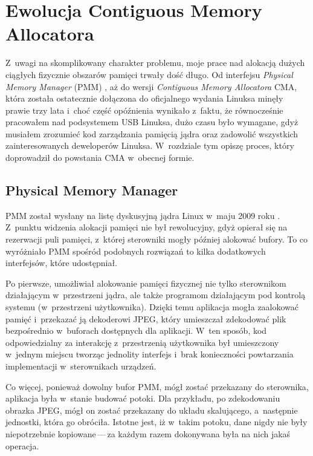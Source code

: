 \chapter{Ewolucja Contiguous Memory Allocatora}

Z~uwagi na skomplikowany charakter problemu, moje prace nad alokacją
dużych ciągłych fizycznie obszarów pamięci trwały dość długo.  Od
interfejsu \textit{Physical Memory Manager} (PMM)
\autocite{patch:pmm}, aż do wersji \textit{Contiguous Memory
  Allocatora} CMA, która została ostatecznie dołączona do oficjalnego
wydania Linuksa \autocite{patch:cma-24} minęły prawie trzy lata i~choć
część opóźnienia wynikało z~faktu, że równocześnie pracowałem nad
podsystemem USB Linuksa, dużo czasu było wymagane, gdyż musiałem
zrozumieć kod zarządzania pamięcią jądra oraz zadowolić wszystkich
zainteresowanych deweloperów Linuksa.  W~rozdziale tym opiszę proces,
który doprowadził do powstania CMA w~obecnej formie.


\section{Physical Memory Manager}\label{sec:evo-pmm}

PMM został wysłany na listę dyskusyjną jądra Linux w~maju 2009 roku
\autocite{patch:pmm}.  Z~punktu widzenia alokacji pamięci nie był
rewolucyjny, gdyż opierał się na rezerwacji puli pamięci, z~której
sterowniki mogły później alokować bufory.  To co wyróżniało PMM
spośród podobnych rozwiązań to kilka dodatkowych interfejsów, które
udostępniał.

Po pierwsze, umożliwiał alokowanie pamięci fizycznej nie tylko
sterownikom działającym w~przestrzeni jądra, ale także programom
działającym pod kontrolą systemu (w~przestrzeni użytkownika).  Dzięki
temu aplikacja mogła zaalokować pamięć i~przekazać ją dekoderowi JPEG,
który umieszczał zdekodować plik bezpośrednio w~buforach dostępnych
dla aplikacji. W~ten sposób, kod odpowiedzialny za interakcję
z~przestrzenią użytkownika był umieszczony w~jednym miejscu tworząc
jednolity interfejs i~brak konieczności powtarzania implementacji
w~sterownikach urządzeń.

Co więcej, ponieważ dowolny bufor PMM, mógł zostać przekazany do
sterownika, aplikacja była w~stanie budować potoki.  Dla przykładu, po
zdekodowaniu obrazka JPEG, mógł on zostać przekazany do układu
skalującego, a~następnie jednostki, która go obróciła.  Istotne jest,
iż w~takim potoku, dane nigdy nie były niepotrzebnie kopiowane\,---\,za
każdym razem dokonywana była na nich jakaś operacja.


